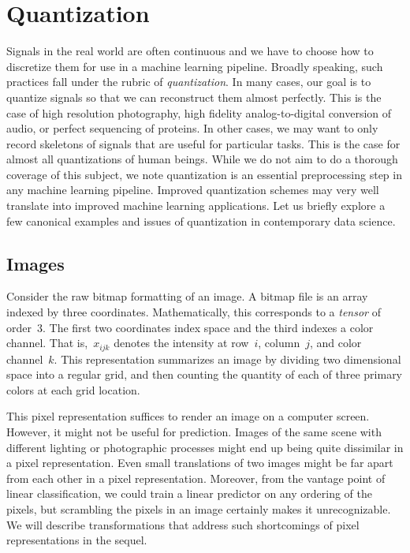 \documentclass{tufte-book}
\begin{document}
\hypertarget{quantization}{%
\section{Quantization}\label{quantization}}


Signals in the real world are often continuous and we have to choose how
to discretize them for use in a machine learning pipeline. Broadly
speaking, such practices fall under the rubric of \emph{quantization}.
In many cases, our goal is to quantize signals so that we can
reconstruct them almost perfectly. This is the case of high resolution
photography, high fidelity analog-to-digital conversion of audio, or
perfect sequencing of proteins. In other cases, we may want to only
record skeletons of signals that are useful for particular tasks. This
is the case for almost all quantizations of human beings. While we do
not aim to do a thorough coverage of this subject, we note quantization
is an essential preprocessing step in any machine learning pipeline.
Improved quantization schemes may very well translate into improved
machine learning applications. Let us briefly explore a few canonical
examples and issues of quantization in contemporary data science.

\hypertarget{images}{%
\subsection{Images}\label{images}}

Consider the raw bitmap formatting of an image. A bitmap file is an
array indexed by three coordinates. Mathematically, this corresponds to
a \emph{tensor} of order~\(3\). The first two coordinates index space
and the third indexes a color channel. That is,~\(x_{ijk}\) denotes the
intensity at row~\(i\), column~\(j\), and color channel~\(k\). This
representation summarizes an image by dividing two dimensional space
into a regular grid, and then counting the quantity of each of three
primary colors at each grid location.

This pixel representation suffices to render an image on a computer
screen. However, it might not be useful for prediction. Images of the
same scene with different lighting or photographic processes might end
up being quite dissimilar in a pixel representation. Even small
translations of two images might be far apart from each other in a pixel
representation. Moreover, from the vantage point of linear
classification, we could train a linear predictor on any ordering of the
pixels, but scrambling the pixels in an image certainly makes it
unrecognizable. We will describe transformations that address such
shortcomings of pixel representations in the sequel.
\end{document}
